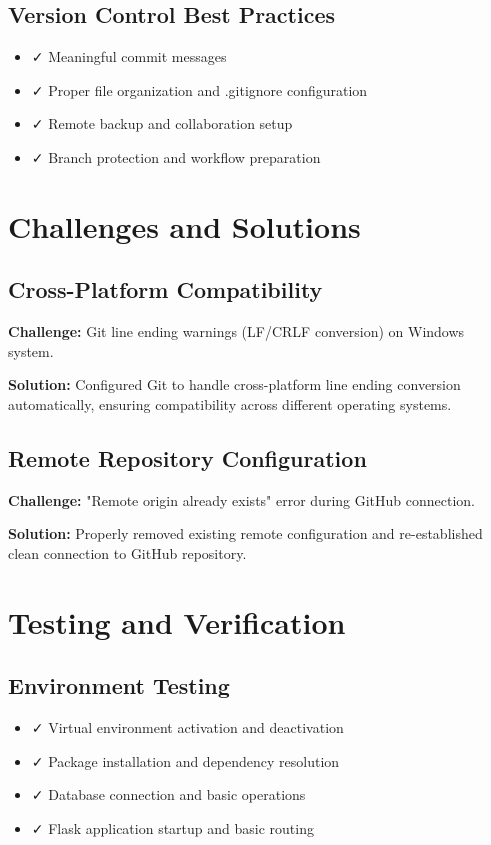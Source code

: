 \documentclass[12pt,a4paper]{article}
\begin{document}
\subsection{Version Control Best Practices}
\begin{itemize}
    \item ✓ Meaningful commit messages
    \item ✓ Proper file organization and .gitignore configuration
    \item ✓ Remote backup and collaboration setup
    \item ✓ Branch protection and workflow preparation
\end{itemize}

\section{Challenges and Solutions}

\subsection{Cross-Platform Compatibility}
\textbf{Challenge:} Git line ending warnings (LF/CRLF conversion) on Windows system.

\textbf{Solution:} Configured Git to handle cross-platform line ending conversion automatically, ensuring compatibility across different operating systems.

\subsection{Remote Repository Configuration}
\textbf{Challenge:} "Remote origin already exists" error during GitHub connection.

\textbf{Solution:} Properly removed existing remote configuration and re-established clean connection to GitHub repository.

\section{Testing and Verification}

\subsection{Environment Testing}
\begin{itemize}
    \item ✓ Virtual environment activation and deactivation
    \item ✓ Package installation and dependency resolution
    \item ✓ Database connection and basic operations
    \item ✓ Flask application startup and basic routing
\end{itemize}
\end{document}
